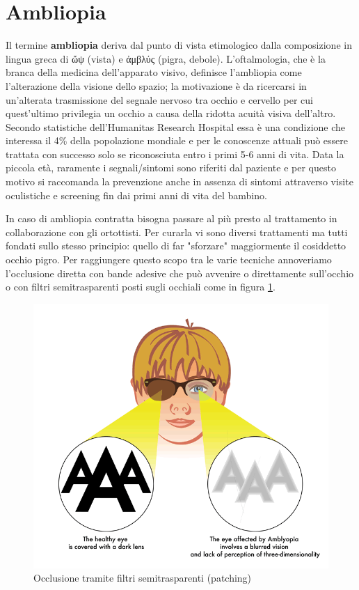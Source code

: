 \documentclass[
	corpo=12pt,
	twoside,
 	evenboxes,
	tipotesi=triennale,
    	stile=classica,
   	 greek,
]{toptesi}
\begin{document}
\section{Ambliopia}
\label{sec:ambliopia}
Il termine \textbf{ambliopia} deriva dal punto di vista etimologico dalla composizione in lingua greca di \textgreek{ὤψ} (vista) e \textgreek{ἀμβλύς} (pigra, debole). L'oftalmologia, che è la branca della medicina dell'apparato visivo, definisce l'ambliopia come l'alterazione della visione dello spazio; la motivazione è da ricercarsi in un'alterata trasmissione del segnale nervoso tra occhio e cervello per cui quest'ultimo privilegia un occhio a causa della ridotta acuità visiva dell'altro. Secondo statistiche dell'Humanitas Research Hospital \cite{ambliopia} essa è una condizione che interessa il 4\% della popolazione mondiale e per le conoscenze attuali può essere trattata con successo solo se riconosciuta entro i primi 5-6 anni di vita. Data la piccola età, raramente i segnali/sintomi sono riferiti dal paziente e per questo motivo si raccomanda la prevenzione anche in assenza di sintomi attraverso visite oculistiche e screening fin dai primi anni di vita del bambino.

In caso di ambliopia contratta bisogna passare al più presto al trattamento in collaborazione con gli ortottisti. Per curarla vi sono diversi trattamenti ma tutti fondati sullo stesso principio: quello di far "sforzare" maggiormente il cosiddetto occhio pigro. Per raggiungere questo scopo tra le varie tecniche annoveriamo l'occlusione diretta con bande adesive che può avvenire o direttamente sull'occhio o con filtri semitrasparenti posti sugli occhiali come in figura \ref{fig:occhio_pigro_ambliopia}.

\newpage

\begin{figure}[H]
\centering
\includegraphics[width=0.70\columnwidth]{images/occhio_pigro_ambliopia.png}
\caption{Occlusione tramite filtri semitrasparenti (patching)}
\label{fig:occhio_pigro_ambliopia}
\end{figure}
\end{document}
